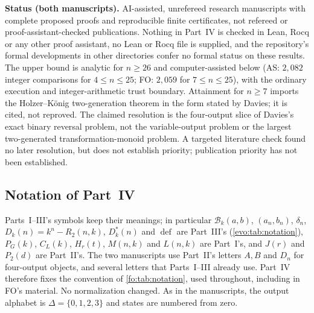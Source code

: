 \documentclass[11pt,a4paper]{article}
\numberwithin{equation}{section}
\theoremstyle{definition}
\theoremstyle{remark}
\newcommand{\D}{\Delta}
\newcommand{\Bip}{\mathcal B}
\newcommand{\defi}{\operatorname{def}}
\begin{document}
\begin{resultbox}
\textbf{Status (both manuscripts).} AI-assisted, unrefereed research
manuscripts with complete proposed proofs and reproducible finite
certificates, not refereed or proof-assistant-checked publications. Nothing in
Part~IV is checked in Lean, Rocq or any other proof assistant, no Lean or
Rocq file is supplied, and the repository's formal developments in other
directories confer no formal status on these results. The upper bound is
analytic for $n\ge26$ and computer-assisted below (AS: $2{,}082$ integer
comparisons for $4\le n\le25$; FO: $2{,}059$ for $7\le n\le25$), with the
ordinary execution and integer-arithmetic trust boundary. Attainment for
$n\ge7$ imports the Holzer--K\"onig two-generation theorem in the form stated
by Davies; it is cited, not reproved. The claimed resolution is the
four-output slice of Davies's exact binary reversal problem, not the
variable-output problem or the largest two-generated transformation-monoid
problem. A targeted literature check found no later resolution, but does not
establish priority; publication priority has not been established.
\end{resultbox}

\subsection{Notation of Part~IV}\label{fo:sec:notation}

Parts~I--III's symbols keep their meanings; in particular $\Bip_k(a,b)$,
$(a_n,b_n)$, $\delta_n$, $D_k(n)=k^n-R_2(n,k)$, $D^*_k(n)$ and $\defi$ are
Part~III's (\cref{evo:tab:notation}), $P_G(k)$, $C_L(k)$, $H_r(t)$, $M(n,k)$
and $L(n,k)$ are Part~I's, and $J(r)$ and $P_2(d)$ are Part~II's. The two
manuscripts use Part~II's letters $A,B$ and $D_n$ for four-output objects, and
several letters that Parts~I--III already use. Part~IV therefore fixes the
convention of \cref{fo:tab:notation}, used throughout, including in FO's
material. No normalization changed. As in the manuscripts, the output
alphabet is $\D=\{0,1,2,3\}$ and states are numbered from zero.
\end{document}
